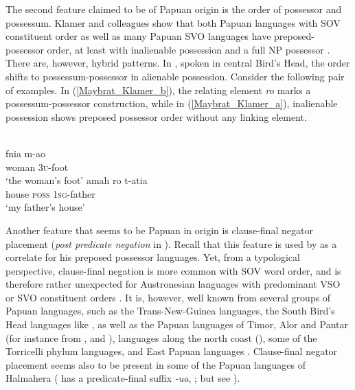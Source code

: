 The second feature claimed to be of Papuan origin is the order of possessor and possessum. Klamer and colleagues show that both Papuan languages with SOV constituent order as well as many Papuan SVO languages have preposed-possessor order, at least with inalienable possession and a full NP possessor \citep[123f.]{klamer2008east}. There are, however, hybrid patterns. In , spoken in central Bird's Head, the order shifts to possessum-possessor in alienable possession. Consider the following pair of examples. In (\ref{Maybrat_Klamer_b}), the relating element \textit{ro} marks a possessum-possessor construction, while in (\ref{Maybrat_Klamer_a}), inalienable possession shows preposed possessor order without any linking element.

\ea
{}\\
\ea \label{Maybrat_Klamer_a}
\gll fnia m-ao\\
woman \textsc{3}\textsc{u}-foot\\
\glt ‘the woman's foot’
\ex \label{Maybrat_Klamer_b}
\gll amah ro t-atia\\
house \textsc{poss} \textsc{1}\textsc{sg}-father\\
\glt ‘my father's house’
\z
\z

Another feature that seems to be Papuan in origin is clause-final negator placement (\textit{post predicate negation} in \citealt{klamer2008east}). Recall that this feature is used by \citet{Himmelmann2005austronesian} as a correlate for his preposed possessor languages. Yet, from a typological perspective, clause-final negation is more common with SOV word order, and is therefore rather unexpected for Austronesian languages with predominant VSO or SVO constituent orders \citep{klamer2008east}. It is, however, well known from several groups of Papuan languages, such as the Trans-New-Guinea languages, the South Bird's Head languages like , as well as the Papuan languages of Timor, Alor and Pantar (for instance from ,  and ),  languages along the north coast (), some of the Torricelli phylum languages, and East Papuan languages \citep{klamer2008east}. Clause-final negator placement seems also to be present in some of the Papuan languages of Halmahera ( has a predicate-final suffix \textit{-ua}, \citealt{holton2003tobelo}; but see \citealt[131]{klamer2008east}).


